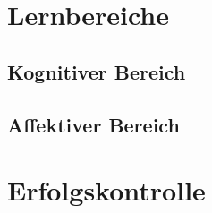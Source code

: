 \section{Lernbereiche}


\subsection{Kognitiver Bereich}


\subsection{Affektiver Bereich}



\section{Erfolgskontrolle}\label{kap3:erfolg}



